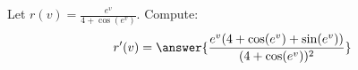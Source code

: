 \documentclass{ximera}
\begin{document}
\begin{exercise}
	Let $r(v) = \frac{e^v}{4+\cos(e^v)}$. Compute:
	\[ r'(v) =\answer{ \frac{e^v(4+\cos(e^v) + \sin(e^v))}{(4+\cos(e^v))^2}  } \]
\end{exercise}
\end{document}
